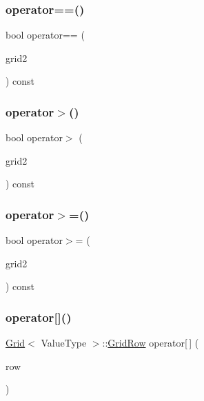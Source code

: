 \mbox{\label{classGrid_ae321d29c4eab96f54c2f86929a345e2b}} 
\subsubsection{\texorpdfstring{operator==()}{operator==()}}
{\footnotesize\ttfamily bool operator== (\begin{DoxyParamCaption}\item[{const \mbox{\hyperlink{classGrid}{Grid}}$<$ Value\+Type $>$ \&}]{grid2 }\end{DoxyParamCaption}) const}

\mbox{\label{classGrid_aa2d6af2768a176d9ba044cf34087d766}} 
\subsubsection{\texorpdfstring{operator$>$()}{operator>()}}
{\footnotesize\ttfamily bool operator$>$ (\begin{DoxyParamCaption}\item[{const \mbox{\hyperlink{classGrid}{Grid}}$<$ Value\+Type $>$ \&}]{grid2 }\end{DoxyParamCaption}) const}

\mbox{\label{classGrid_a21431c500035c200656a8d67e96531c7}} 
\subsubsection{\texorpdfstring{operator$>$=()}{operator>=()}}
{\footnotesize\ttfamily bool operator$>$= (\begin{DoxyParamCaption}\item[{const \mbox{\hyperlink{classGrid}{Grid}}$<$ Value\+Type $>$ \&}]{grid2 }\end{DoxyParamCaption}) const}

\mbox{\label{classGrid_aa62a62fb923c387dbec19d9559fea429}} 
\subsubsection{\texorpdfstring{operator[]()}{operator[]()}\hspace{0.1cm}{\footnotesize\ttfamily [1/4]}}
{\footnotesize\ttfamily \mbox{\hyperlink{classGrid}{Grid}}$<$ Value\+Type $>$\+::\mbox{\hyperlink{classGrid_1_1GridRow}{Grid\+Row}} operator\mbox{[}$\,$\mbox{]} (\begin{DoxyParamCaption}\item[{int}]{row }\end{DoxyParamCaption})}

